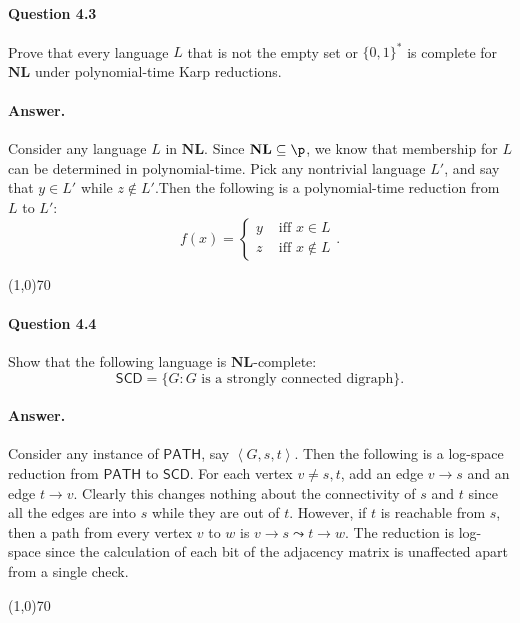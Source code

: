 \paragraph{Question 4.3} Prove that every language $L$ that is not the empty set or $\{0,1\}^{*}$ is complete for $\mathbf{NL}$ under polynomial-time Karp reductions.

\paragraph{Answer.} Consider any language $L$ in $\mathbf{NL}$. Since $\mathbf{NL}\subseteq\p$, we know that membership for $L$ can be determined in polynomial-time. Pick any nontrivial language $L'$, and say that $y\in L'$ while $z\notin L'$.Then the following is a polynomial-time reduction from $L$ to $L'$:
$$f(x)=
\begin{cases}
	y&\text{ iff $x\in L$}\\
	z&\text{ iff $x\notin L$}
\end{cases}.$$

\begin{center}
	\line(1,0){70}
\end{center}

\paragraph{Question 4.4} Show that the following language is $\mathbf{NL}$-complete:
$$\mathsf{SCD}=\{G:G\text{ is a strongly connected digraph}\}.$$

\paragraph{Answer.} Consider any instance of $\mathsf{PATH}$, say $\left\langle G, s, t\right\rangle$. Then the following is a log-space reduction from $\mathsf{PATH}$ to $\mathsf{SCD}$. For each vertex $v\neq s,t$, add an edge $v\rightarrow s$ and an edge $t\rightarrow v$. Clearly this changes nothing about the connectivity of $s$ and $t$ since all the edges are into $s$ while they are out of $t$. However, if $t$ is reachable from $s$, then a path from every vertex $v$ to $w$ is $v\rightarrow s\leadsto t\rightarrow w$. The reduction is log-space since the calculation of each bit of the adjacency matrix is unaffected apart from a single check.

\begin{center}
	\line(1,0){70}
\end{center}

